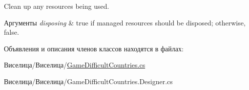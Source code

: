 Clean up any resources being used. 


\begin{DoxyParams}{Аргументы}
{\em disposing} & true if managed resources should be disposed; otherwise, false.\\
\hline
\end{DoxyParams}


Объявления и описания членов классов находятся в файлах\+:\begin{DoxyCompactItemize}
\item 
Виселица/Виселица/\hyperlink{_game_difficult_countries_8cs}{Game\+Difficult\+Countries.\+cs}\item 
Виселица/Виселица/Game\+Difficult\+Countries.\+Designer.\+cs\end{DoxyCompactItemize}
